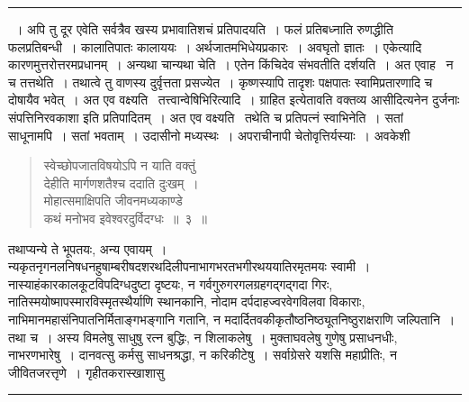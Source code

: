 \documentclass[11pt, openany]{book}
\begin{document}
\vspace{2mm}
\hrule

\noindent
{~। अपि तु दूर एवेति सर्वत्रैव खस्य प्रभावातिशचं प्रतिपादयति~। फलं प्रतिबध्नाति रुणद्धीति फलप्रतिबन्धी~। कालातिपातः कालाययः~। अर्थजातमभिधेयप्रकारः~। अवघृतो ज्ञातः~। एकेत्यादि कारणमुत्तरोत्तरमप्रधानम्~। अन्यथा चान्यथा चेति~। एतेन किंचिदेव संभवतीति दर्शयति~। अत एवाह \textendash\ {\qtt न च तत्तथेति}~। तथात्वे तु वाणस्य दुर्वृत्तता प्रसज्येत~। कृष्णस्यापि तादृशः पक्षपातः स्वामिप्रतारणादि च दोषायैव भवेत्~। अत एव वक्ष्यति \textendash\ {\qtt तत्त्वान्वेषिभिरित्यादि}~। ग्राहित इत्येतावति वक्तव्य आसीदित्यनेन दुर्जनाः संपत्तिनिरवकाशा इति प्रतिपादितम्~। अत एव वक्ष्यति \textendash\ {\qtt तथेति च प्रतिपत्नं स्वाभिनेति}~। सतां साधूनामपि~। सतां भवताम्~। उदासीनो मध्यस्थः~। अपराचीनापी चेतोवृत्तिर्यस्याः~। अवकेशी}

\newpage

\begin{quote}
{\ha स्वेच्छोपजातविषयोऽपि न याति वक्तुं\\
देहीति मार्गणशतैश्च ददाति दुःखम्~। \\
मोहात्समाक्षिपति जीवनमध्यकाण्डे\\
कथं मनोभव इवेश्वरदुर्विदग्धः~॥~३~॥}
\end{quote}

\vspace{-3mm}
तथाप्यन्ये ते भूपतयः, अन्य एवायम्~। न्यकृतनृगनलनिषधनहुषाम्बरीषदशरथदिलीपनाभागभरतभगीरथययातिरमृतमयः स्वामी~। नास्याहंकारकालकूटविपदिग्धदुष्टा दृष्टयः, न गर्वगुरुगरगलग्रहगद्गद्गदा गिरः, नातिस्मयोष्मापस्मारविस्मृतस्थैर्याणि स्थानकानि, नोदाम दर्पदाहज्वरवेगविलवा विकाराः, नाभिमानमहासंनिपातनिर्मिताङ्गभङ्गानि गतानि, न मदार्दितवकीकृतौष्ठनिष्ठ्यूतनिष्ठुराक्षराणि जल्पितानि~। तथा च~। अस्य विमलेषु साधुषु रत्न बुद्धिः, न शिलाकलेषु~। मुक्ताघवलेषु गुणेषु प्रसाधनधीः, नाभरणभारेषु~। दानवत्सु कर्मसु साधनश्रद्धा, न करिकीटेषु~। सर्वाग्रेसरे यशसि महाप्रीतिः, न जीवितजरत्तृणे~। गृहीतकरास्खाशासु

\vspace{2mm}
\hrule
\end{document}

